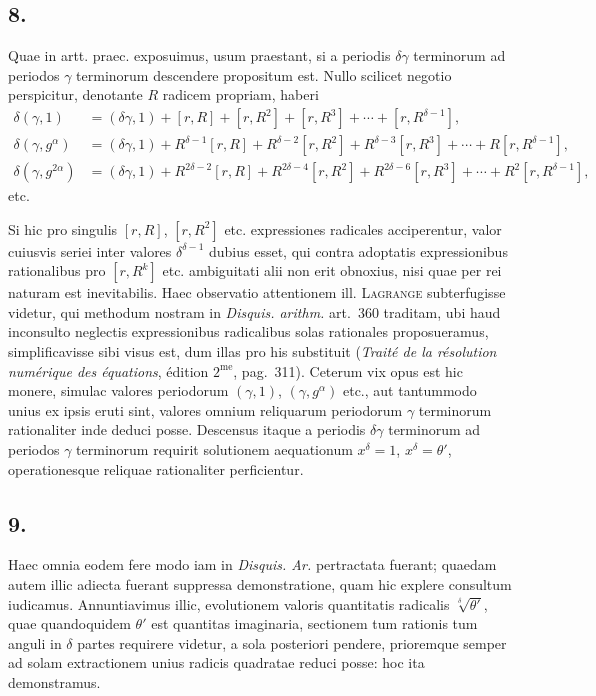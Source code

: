 \documentclass[12pt]{article}
\begin{document}
\subsection*{8.}

Quae in artt. praec. exposuimus, usum praestant, si a periodis $\delta\gamma$ terminorum ad periodos $\gamma$ terminorum descendere propositum est. Nullo scilicet negotio perspicitur, denotante $R$ radicem propriam, haberi
\[
\begin{aligned}
\delta(\gamma,1)&=(\delta\gamma,1)+[r,R]+[r,R^2]+[r,R^3]+\cdots+[r,R^{\delta-1}],\\
\delta(\gamma,g^\alpha)&=(\delta\gamma,1)+R^{\delta-1}[r,R]+R^{\delta-2}[r,R^2]+R^{\delta-3}[r,R^3]+\cdots+R[r,R^{\delta-1}],\\
\delta(\gamma,g^{2\alpha})&=(\delta\gamma,1)+R^{2\delta-2}[r,R]+R^{2\delta-4}[r,R^2]+R^{2\delta-6}[r,R^3]+\cdots+R^2[r,R^{\delta-1}],
\end{aligned}
\]
etc.

Si hic pro singulis $[r,R]$, $[r,R^2]$ etc. expressiones radicales acciperentur, valor cuiusvis seriei inter valores $\delta^{\delta-1}$ dubius esset, qui contra adoptatis expressionibus rationalibus pro $[r,R^k]$ etc. ambiguitati alii non erit obnoxius, nisi quae per rei naturam est inevitabilis. Haec observatio attentionem ill. \textsc{Lagrange} subterfugisse videtur, qui methodum nostram in \emph{Disquis. arithm.} art.~360 traditam, ubi haud inconsulto neglectis expressionibus radicalibus solas rationales proposueramus, simplificavisse sibi visus est, dum illas pro his substituit (\emph{Traité de la résolution numérique des équations}, édition $2^{\mathrm{me}}$, pag.~311). Ceterum vix opus est hic monere, simulac valores periodorum $(\gamma,1)$, $(\gamma,g^\alpha)$ etc., aut tantummodo unius ex ipsis eruti sint, valores omnium reliquarum periodorum $\gamma$ terminorum rationaliter inde deduci posse. Descensus itaque a periodis $\delta\gamma$ terminorum ad periodos $\gamma$ terminorum requirit solutionem aequationum $x^\delta=1$, $x^\delta=\theta'$, operationesque reliquae rationaliter perficientur.

\subsection*{9.}

Haec omnia eodem fere modo iam in \emph{Disquis. Ar.} pertractata fuerant; quaedam autem illic adiecta fuerant suppressa demonstratione, quam hic explere consultum iudicamus. Annuntiavimus illic, evolutionem valoris quantitatis radicalis $\sqrt[\delta]{\theta'}$, quae quandoquidem $\theta'$ est quantitas imaginaria, sectionem tum rationis tum anguli in $\delta$ partes requirere videtur, a sola posteriori pendere, prioremque semper ad solam extractionem unius radicis quadratae reduci posse: hoc ita demonstramus.
\end{document}

